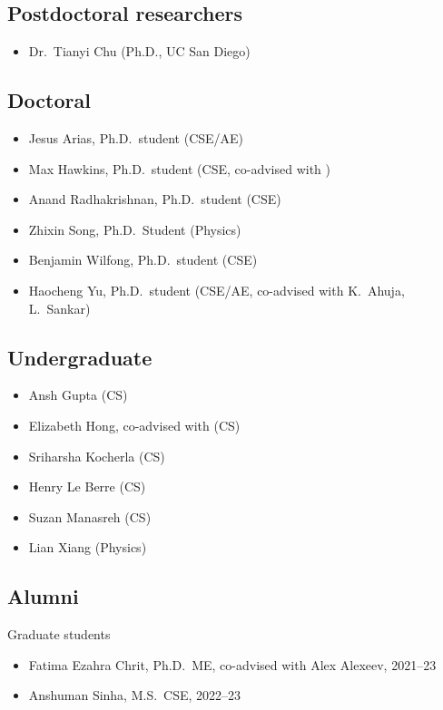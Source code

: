 \subsection{Postdoctoral researchers}

\begin{itemize}
    \item Dr.\ Tianyi Chu (Ph.D., UC San Diego)
\end{itemize}

\subsection{Doctoral}

\begin{itemize}
    \item Jesus Arias, Ph.D.\ student (CSE/AE)
    \item Max Hawkins, Ph.D.\ student (CSE, co-advised with \Rich)
    \item Anand Radhakrishnan, Ph.D.\ student (CSE)
    \item Zhixin Song, Ph.D.\ Student (Physics)
    \item Benjamin Wilfong, Ph.D.\ student (CSE)
    \item Haocheng Yu, Ph.D.\ student (CSE/AE, co-advised with K.\ Ahuja, L.\ Sankar)
\end{itemize}

\subsection{Undergraduate}

\begin{itemize}
    \item Ansh Gupta (CS)
    \item Elizabeth Hong, co-advised with \Rich (CS)
    \item Sriharsha Kocherla (CS)
    \item Henry Le Berre (CS)
    \item Suzan Manasreh (CS)
    \item Lian Xiang (Physics)
\end{itemize}

\subsection{Alumni}

Graduate students
\begin{itemize}
    \item Fatima Ezahra Chrit, Ph.D.\ ME, co-advised with Alex Alexeev, 2021--23
    \item Anshuman Sinha, M.S.\ CSE, 2022--23
\end{itemize}

